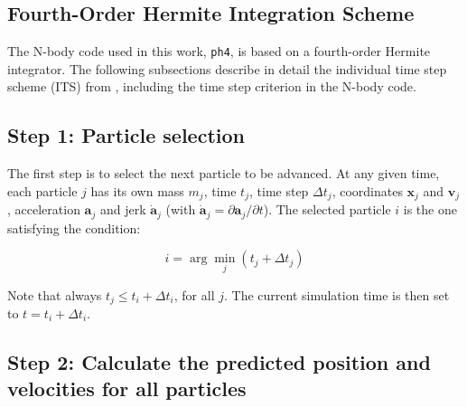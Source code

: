 \begin{appendixs}
	\section{Fourth-Order Hermite Integration Scheme}
	The N-body code used in this work, \texttt{ph4}, is based on a fourth-order Hermite integrator. The following subsections describe in detail the individual time step scheme (ITS) from \cite{makino1992}, including the time step criterion in the N-body code.
	
	\subsection{Step 1: Particle selection}
	The first step is to select the next particle to be advanced. At any given time, each particle $j$ has its own mass $m_j$, time $t_j$, time step $\Delta t_j$, coordinates $\mathbf{x}_j$ and $\mathbf{v}_j$, acceleration $\mathbf{a}_j$ and jerk $\dot{\mathbf{a}}_j$ (with $\dot{\mathbf{a}}_j = \partial \mathbf{a}_j / \partial t$). The selected particle $i$ is the one satisfying the condition:
	
	\begin{equation}
		i = \arg\min_j(t_j + \Delta t_j)
	\end{equation}
	
	Note that always $t_j \leq t_i + \Delta t_i$, for all $j$. The current simulation time is then set to $t = t_i + \Delta t_i$.
	
	\subsection{Step 2: Calculate the predicted position and velocities for all particles}
	

\end{appendixs}
